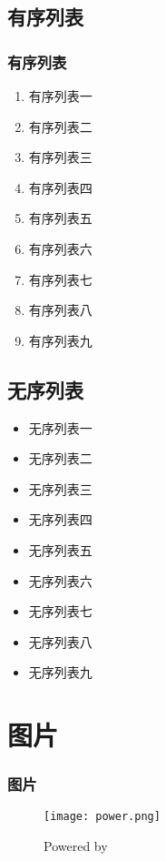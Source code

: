 \subsection{有序列表}
\begin{frame}
	\frametitle{有序列表}
	  \begin{enumerate}[<+-|alert@+>]
		  \item 有序列表一
		  \item 有序列表二
		  \item 有序列表三
		  \item 有序列表四
		  \item 有序列表五
		  \item 有序列表六
		  \item 有序列表七
		  \item 有序列表八
		  \item 有序列表九
	  \end{enumerate}
\end{frame}
\subsection{无序列表}
\begin{frame}
	\begin{itemize}
		 \item 无序列表一
		\hilite <2-3> \item 无序列表二
		\hilite <3> \item 无序列表三
		\hilite <4-> \item 无序列表四
		\hilite <5> \item 无序列表五
		\hilite <-6> \item 无序列表六
		\hilite <7> \item 无序列表七
		\hilite <8> \item 无序列表八
		\hilite <9> \item 无序列表九
	\end{itemize}
\end{frame}

\section{图片}
\begin{frame}
	\frametitle{图片}
	\begin{figure}[htbp]
    \centering
    \texttt{[image: power.png]}
    \caption{Powered by}
    \label{fig:power}
    \end{figure}
\end{frame}

